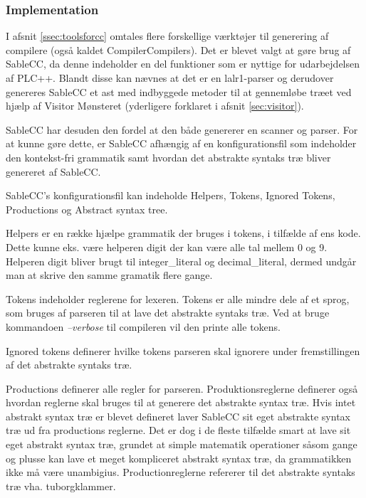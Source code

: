 \subsubsection{Implementation}

I afsnit \ref{ssec:toolsforcc} omtales flere forskellige værktøjer til generering af compilere (også kaldet CompilerCompilers). Det er blevet valgt at gøre brug af SableCC, da denne indeholder en del funktioner som er nyttige for udarbejdelsen af PLC++. Blandt disse kan nævnes at det er en \gls{lalr}1-parser og derudover genereres SableCC et \gls{ast} med indbyggede metoder til at gennemløbe træet ved hjælp af Visitor Mønsteret (yderligere forklaret i afsnit \ref{sec:visitor}).

SableCC har desuden den fordel at den både genererer en scanner og parser. For at kunne gøre dette, er SableCC afhængig af en konfigurationsfil som indeholder den kontekst-fri grammatik samt hvordan det abstrakte syntaks træ bliver genereret af SableCC.

SableCC's konfigurationsfil kan indeholde Helpers, Tokens, Ignored Tokens, Productions og Abstract syntax tree.

Helpers er en række hjælpe grammatik der bruges i tokens, i tilfælde af ens kode. Dette kunne eks. være helperen digit der kan være alle tal mellem 0 og 9. Helperen digit bliver brugt til integer\_literal og decimal\_literal, dermed undgår man at skrive den samme gramatik flere gange.

Tokens indeholder reglerene for lexeren. Tokens er alle mindre dele af et sprog, som bruges af parseren til at lave det abstrakte syntaks træ. Ved at bruge kommandoen \textit{--verbose} til compileren vil den printe alle tokens.

Ignored tokens definerer hvilke tokens parseren skal ignorere under fremstillingen af det abstrakte syntaks træ.

Productions definerer alle regler for parseren. Produktionsreglerne definerer også hvordan reglerne skal bruges til at generere det abstrakte syntax træ. Hvis intet abstrakt syntax træ er blevet defineret laver SableCC sit eget abstrakte syntax træ ud fra productions reglerne. Det er dog i de fleste tilfælde smart at lave sit eget abstrakt syntax træ, grundet at simple matematik operationer såsom gange og plusse kan lave et meget kompliceret abstrakt syntax træ, da grammatikken ikke må være unambigius. Productionreglerne refererer til det abstrakte syntaks træ vha. tuborgklammer. 


